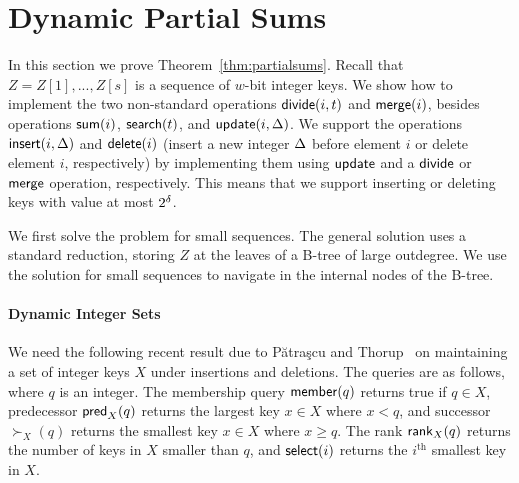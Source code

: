 \section{Dynamic Partial Sums}\label{sec:dynps}
In this section we prove Theorem~\ref{thm:partialsums}. Recall that $Z=Z[1],...,Z[s]$ is a sequence of $w$-bit integer keys. We show how to implement the two non-standard operations $\mathsf{divide}(i, t)$ and $\mathsf{merge}(i)$, besides operations $\mathsf{sum}(i)$, $\mathsf{search}(t)$, and $\mathsf{update}(i, \Delta)$. 
We support the operations $\mathsf{insert}(i, \Delta)$ and $\mathsf{delete}(i)$ (insert a new integer $\Delta$ before element $i$ or delete element $i$, respectively) by implementing them using $\mathsf{update}$ and a $\mathsf{divide}$ or $\mathsf{merge}$ operation, respectively. This means that we support inserting or deleting keys with value at most $2^\delta$.

We first solve the problem for small sequences. The general solution uses a standard reduction, storing $Z$ at the leaves of a B-tree of large outdegree. We use the solution for small sequences to navigate in the internal nodes of the B-tree.

\paragraph{Dynamic Integer Sets}
We need the following recent result due to Pătraşcu and Thorup~\cite{patrascu2014dynamic} on maintaining a set of integer keys $X$ under insertions and deletions.
The queries are as follows, where $q$ is an integer. The membership query $\mathsf{member}(q)$ returns true if $q \in X$, predecessor $\mathsf{pred}_X(q)$ returns the largest key $x \in X$ where $x < q$, and successor $\succ_X(q)$ returns the smallest key $x \in X$ where $x \geq q$. The rank $\mathsf{rank}_X(q)$ returns the number of keys in $X$ smaller than $q$, and $\mathsf{select}(i)$ returns the $i^\text{th}$ smallest key in $X$.

